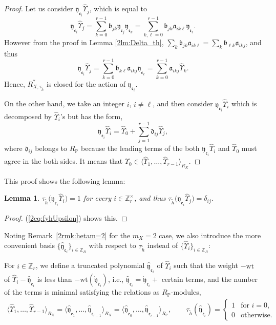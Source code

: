 \documentclass[10pt,a4paper]{amsart}
\def\ZZ{{\mathbb Z}}
\def\PP{{\mathbb P}}
\def\fa{{\mathfrak a}}
\def\fb{{\mathfrak b}}
\def\fd{{\mathfrak d}}
\def\fe{{\mathfrak e}}
\def\fy{{\mathfrak y}}
\def\th{{\widetilde h}}
\def\hfy{{\widehat{\mathfrak y}}}
\def\hUpsilon{{\widehat \Upsilon}}
\def\rfy{{\mathring{\mathfrak y}}}
\def\wt{{\mathrm {wt}}}
\numberwithin{equation}{section}
\newtheorem{Lemma}[Theorem]{Lemma}
\begin{document}
\begin{proof}
Let us consider $\fy_{\fe_i} \hUpsilon_{j}$, which is equal to
\[
 \fy_{\fe_i} \hUpsilon_{j}
 =\sum_{k=0}^{r-1} \fb_{j k}\fy_{\fe_j}\fy_{\fe_k}
=\sum_{k,\ell=0}^{r-1} \fb_{j k}\fa_{i k\ell}\fy_{\fe_\ell}.
\]
However from the proof in Lemma \ref{2lm:Delta_th},
$\sum_k\fb_{j k}\fa_{i k\ell}=\sum_k\fb_{\ell k}\fa_{i k j}$, and thus
\[
 \fy_{\fe_i} \hUpsilon_{j}
 =\sum_{k=0}^{r-1} \fb_{k\ell}\fa_{i k j}\fy_{\fe_\ell}
=\sum_{k=0}^{r-1}\fa_{i k j}\hUpsilon_{k}.
\]
Hence, $R_{X,\tau_\th}^*$ is closed for the action of $\fy_{\fe_i}$.

On the other hand, we take an integer $i$, $i\neq \ell$, and then
consider $\fy_{\fe_i} \hUpsilon_{i}$ which is decomposed by
$\hUpsilon_{i}$'s but has the form,
\begin{equation}
 \fy_{\fe_i} \hUpsilon_{i}=\hUpsilon_0 +\sum_{j=1}^{r-1} \fd_{i j}\hUpsilon_{j},\label{2eq:fyhUpsilon}
\end{equation}
where $\fd_{i j}$ belongs to $R_\PP$ because the leading terms of the both $\fy_{\fe_i} \hUpsilon_{i}$ and $\hUpsilon_0$ must agree in the both sides.
It means that
$\hUpsilon_0 \in \big\langle \hUpsilon_{1}, \dots, \hUpsilon_{r-1}\big\rangle_{R_X}$.
\end{proof}

This proof shows the following lemma:

{\samepage
\begin{Lemma}\label{2lm:tau_th_rfe}
$\tau_\th\big(\fy_{\fe_i} \hUpsilon_{i}\big) =1$ for every $i \in \ZZ_r^\times$, and thus $\tau_\th\big(\fy_{\fe_i} \hUpsilon_{j}\big)=\delta_{i j}$.
\end{Lemma}

\begin{proof}(\ref{2eq:fyhUpsilon}) shows this.
\end{proof}}

Noting Remark~\ref{2rmk:hetam=2} for the $m_X=2$ case, we also introduce the more convenient basis $\{\hfy_{\fe_i}\}_{i \in \ZZ_R}$ with respect to $\tau_{\th}$ instead of $\{\hUpsilon_i\}_{i \in \ZZ_R}$:

\begin{Definition} \label{2df:hfy}
For $i \in \ZZ_r$, we define a truncated polynomial $\hfy_{\fe_i}$ of $\hUpsilon_{i}$ such that the weight $-\wt$ of $\hUpsilon_i -\hfy_{\fe_i}$ is less than $-\wt(\rfy_{\fe_i})$, i.e., $\hfy_{\fe_i}= \rfy_{\fe_i}+$ certain terms, and the number of the terms is minimal satisfying the relations as $R_\PP$-modules,
\begin{gather*}
\big\langle \hUpsilon_{1}, \dots, \hUpsilon_{r-1}\big\rangle_{R_X}
=\big\langle \hfy_{\fe_1}, \dots, \hfy_{\fe_{r-1}}\big\rangle_{R_X}
=\big\langle \hfy_{\fe_0}, \dots, \hfy_{\fe_{r-1}}\big\rangle_{R_\PP},
\qquad \tau_{\th}(\hfy_{\fe_i})=
\begin{cases}
1 & \text{for } i=0,\\
0 & \text{otherwise}.
\end{cases}\!
\end{gather*}
\end{Definition}
\end{document}
